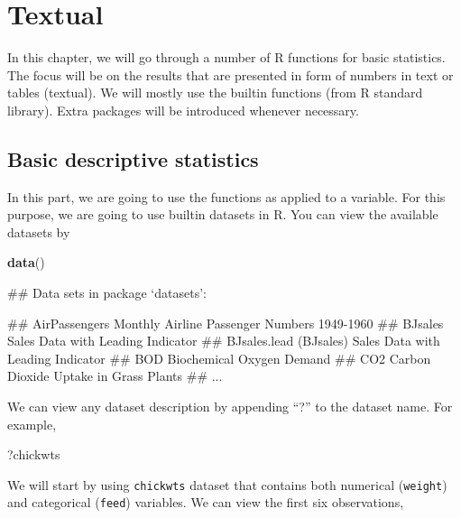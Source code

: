 \documentclass[]{book}
\newenvironment{Shaded}{\begin{snugshade}}{\end{snugshade}}
\newcommand{\KeywordTok}[1]{\textcolor[rgb]{0.13,0.29,0.53}{\textbf{{#1}}}}
\newcommand{\NormalTok}[1]{{#1}}
\theoremstyle{definition}
\theoremstyle{definition}
\theoremstyle{remark}
\begin{document}
\chapter{Textual}\label{textual}

In this chapter, we will go through a number of R functions for basic
statistics. The focus will be on the results that are presented in form
of numbers in text or tables (textual). We will mostly use the builtin
functions (from R standard library). Extra packages will be introduced
whenever necessary.

\section{Basic descriptive
statistics}\label{basic-descriptive-statistics}

In this part, we are going to use the functions as applied to a
variable. For this purpose, we are going to use builtin datasets in R.
You can view the available datasets by

\begin{Shaded}
\begin{Highlighting}[]
\KeywordTok{data}\NormalTok{()}
\end{Highlighting}
\end{Shaded}

\begin{Shaded}
\begin{Highlighting}[]
\NormalTok{## Data sets in package ‘datasets’:}

\NormalTok{## AirPassengers                     Monthly Airline Passenger Numbers 1949-1960}
\NormalTok{## BJsales                           Sales Data with Leading Indicator}
\NormalTok{## BJsales.lead (BJsales)            Sales Data with Leading Indicator}
\NormalTok{## BOD                               Biochemical Oxygen Demand}
\NormalTok{## CO2                               Carbon Dioxide Uptake in Grass Plants}
\NormalTok{## ...}
\end{Highlighting}
\end{Shaded}

We can view any dataset description by appending ``?'' to the dataset
name. For example,

\begin{Shaded}
\begin{Highlighting}[]
\NormalTok{?chickwts}
\end{Highlighting}
\end{Shaded}

We will start by using \texttt{chickwts} dataset that contains both
numerical (\texttt{weight}) and categorical (\texttt{feed}) variables.
We can view the first six observations,
\end{document}

